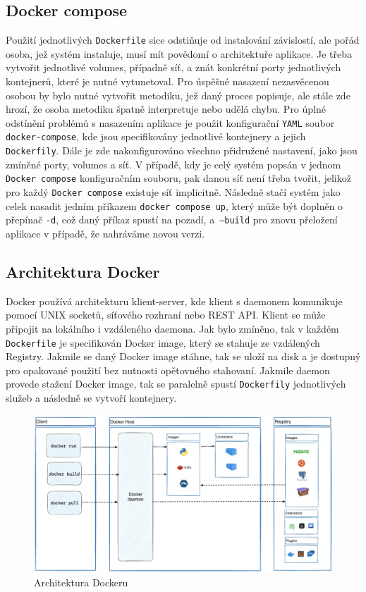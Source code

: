 \subsection{Docker compose}
Použití jednotlivých \texttt{Dockerfile} sice odstiňuje od instalování závislostí, ale pořád osoba, jež systém instaluje, musí mít povědomí o architektuře aplikace. Je třeba vytvořit jednotlivé volumes, případně síť, a znát konkrétní porty jednotlivých kontejnerů, které je nutné vytunetoval. Pro úspěšné nasazení nezasvěcenou osobou by bylo nutné vytvořit metodiku, jež daný proces popisuje, ale stále zde hrozí, že osoba metodiku špatně interpretuje nebo udělá chybu. Pro úplné odstínění problémů s nasazením aplikace je použit konfigurační \texttt{YAML} soubor \texttt{docker-compose}, kde jsou specifikovány jednotlivé kontejnery a jejich \texttt{Dockerfily}. Dále je zde nakonfigurováno všechno přidružené nastavení, jako jsou zmíněné porty, volumes a síť. V případě, kdy je celý systém popsán v jednom \texttt{Docker compose} konfiguračním souboru, pak danou síť není třeba tvořit, jelikož pro každý \texttt{Docker compose} existuje síť implicitně. Následně stačí systém jako celek nasadit jedním příkazem \texttt{docker compose up}, který může být doplněn o přepínač \texttt{-d}, což daný příkaz spustí na pozadí, a~\texttt{--build} pro znovu přeložení aplikace v případě, že nahráváme novou verzi. 

\newpage
\subsection{Architektura Docker}
Docker používá architekturu klient-server, kde klient s daemonem komunikuje pomocí UNIX socketů, síťového rozhraní nebo REST API. Klient se může připojit na lokálního i vzdáleného daemona. Jak bylo zmíněno, tak v každém \texttt{Dockerfile} je specifikován Docker image, který se stahuje ze vzdálených Registry. Jakmile se daný Docker image stáhne, tak se uloží na disk a je dostupný pro opakované použití bez nutnosti opětovného stahovaní. Jakmile daemon provede stažení Docker image, tak se paralelně spustí \texttt{Dockerfily} jednotlivých služeb a následně se vytvoří kontejnery.

\begin{figure}[htbp]
    \centering
        \includegraphics[scale=.3]{obrazky-figures/implementation/docker-architecture.png}
        \caption{Architektura Dockeru \footnotemark}
\end{figure}
